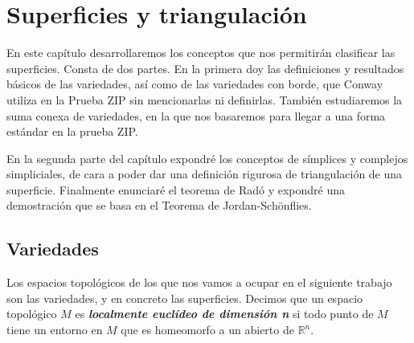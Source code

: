 \documentclass[10pt]{report}
\newcommand{\R}{\mathbb{R}}
\newcommand{\enfatiza}[1]{\textbf{\textit{#1}}}
\theoremstyle{definition}
\newcommand\blankpage{%
    \null
    \thispagestyle{empty}%
    \newpage}
\begin{document}

\tableofcontents
\clearpage




\afterpage{\blankpage}

\chapter{Superficies y triangulación}\label{cap:1}
\setcounter{page}{1}
En este capítulo desarrollaremos los conceptos que nos permitirán clasificar las superficies. Consta de dos partes. En la primera doy las definiciones y resultados básicos de las variedades, así como de las variedades con borde, que Conway utiliza en la Prueba ZIP sin mencionarlas ni definirlas. También estudiaremos la suma conexa de variedades, en la que nos basaremos para llegar a una forma estándar en la prueba ZIP. 

En la segunda parte del capítulo expondré los conceptos de símplices y complejos simpliciales, de cara a poder dar una definición rigurosa de triangulación de una superficie. Finalmente enunciaré el teorema de Radó y expondré una demostración que se basa en el Teorema de Jordan-Schönflies. \\%

\section{Variedades}\label{sec:variedades}
Los espacios topológicos de los que nos vamos a ocupar en el siguiente trabajo son las variedades, y en concreto las superficies. Decimos que un espacio topológico $M$ es \enfatiza{localmente euclídeo de dimensión n} si todo punto de $M$ tiene un entorno en $M$ que es homeomorfo a un abierto de $\R^n$.
\end{document}
